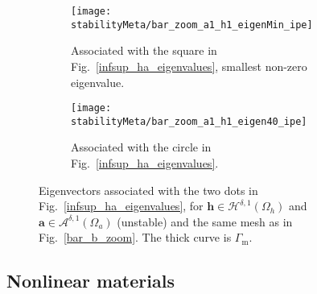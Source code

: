 \documentclass[journal]{IEEEtran}
\renewcommand{\vec}[1]{\boldsymbol{#1}} %
\renewcommand{\a}{\vec a}
\newcommand{\h}{\vec h}
\newcommand{\Oa}{\Omega_a}
\newcommand{\Oh}{\Omega_h}
\newcommand{\Gm}{\Gamma_\text{m}}
\newcommand{\hspdone}{\mathcal{H}^{\delta,1}}
\newcommand{\aspdone}{\mathcal{A}^{\delta,1}}
\begin{document}
\begin{figure}[h!]
\centering
            \begin{subfigure}[b]{\linewidth}
            \centering
		\texttt{[image: stabilityMeta/bar\_zoom\_a1\_h1\_eigenMin\_ipe]}
		\caption{Associated with the square in Fig.~\ref{infsup_ha_eigenvalues}, smallest non-zero eigenvalue.}
		\label{bar_zoom_a1_h1_eigen_min}
        \end{subfigure}
\begin{subfigure}[b]{\linewidth}  
            \centering 
		\texttt{[image: stabilityMeta/bar\_zoom\_a1\_h1\_eigen40\_ipe]}
		\caption{Associated with the circle in Fig.~\ref{infsup_ha_eigenvalues}.}
		\label{bar_zoom_a1_h1_eigen_40}	
      \end{subfigure}
        \caption{Eigenvectors associated with the two dots in Fig.~\ref{infsup_ha_eigenvalues}, for $\h\in \hspdone(\Oh)$ and $\a\in \aspdone(\Oa)$ (unstable) and the same mesh as in Fig.~\ref{bar_b_zoom}. The thick curve is $\Gm$.}
        \label{bar_b_zoom_eigen}
\end{figure}


\subsection{Nonlinear materials}
\end{document}
